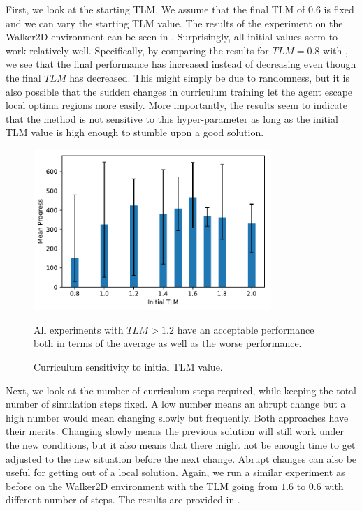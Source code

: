 First, we look at the starting \ac{TLM}. We assume that the final \ac{TLM} of $0.6$ is fixed and we can vary the starting \ac{TLM} value. The results of the experiment on the Walker2D environment can be seen in . Surprisingly, all initial values seem to work relatively well. Specifically, by comparing the results for $TLM=0.8$ with , we see that the final performance has increased instead of decreasing even though the final $TLM$ has decreased. This might simply be due to randomness, but it is also possible that the sudden changes in curriculum training let the agent escape local optima regions more easily. More importantly, the results seem to indicate that the method is not sensitive to this hyper-parameter as long as the initial \ac{TLM} value is high enough to stumble upon a good solution.

\begin{figure}
    \centering
    \includegraphics[width=90mm]{img/TorqueLimit_Curr_TLM.pdf}
    \caption{Curriculum sensitivity to initial \ac{TLM} value.}{All experiments with $TLM > 1.2$ have an acceptable performance both in terms of the average as well as the worse performance.}
    \label{fig:torque_limit_hp_tlm}
\end{figure}

Next, we look at the number of curriculum steps required, while keeping the total number of simulation steps fixed. A low number means an abrupt change but a high number would mean changing slowly but frequently. Both approaches have their merits. Changing slowly means the previous solution will still work under the new conditions, but it also means that there might not be enough time to get adjusted to the new situation before the next change. Abrupt changes can also be useful for getting out of a local solution. Again, we run a similar experiment as before on the Walker2D environment with the \ac{TLM} going from $1.6$ to $0.6$ with different number of steps. The results are provided in .

